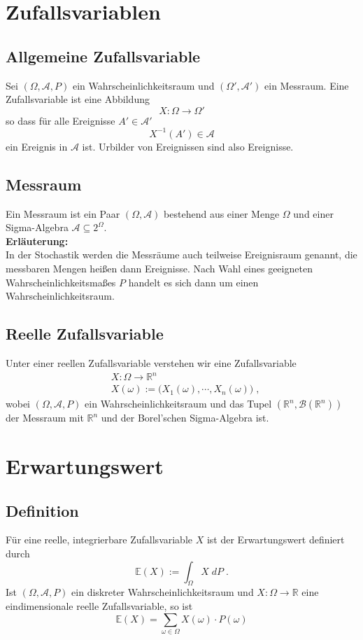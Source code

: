 \documentclass[a4paper]{article}
\begin{document}
\section{Zufallsvariablen}

\subsection{Allgemeine Zufallsvariable}
Sei $(\Omega, \mathcal{A}, P)$ ein Wahrscheinlichkeitsraum und $(\Omega', \mathcal{A}')$ ein Messraum. Eine Zufallsvariable ist eine Abbildung
$$X : \Omega \to \Omega'$$ 
so dass für alle Ereignisse $A' \in  \mathcal{A}'$
$$ X^{-1} (A') \in \mathcal{A}$$
 ein Ereignis in $\mathcal{A}$ ist. Urbilder von Ereignissen sind also Ereignisse.

\subsection{Messraum}
Ein Messraum ist ein Paar $(\Omega, \mathcal{A})$ bestehend aus einer Menge $\Omega$ und einer Sigma-Algebra $\mathcal{A} \subseteq 2^{\Omega}$.\\

\textbf{Erläuterung:}\\
In der Stochastik werden die Messräume auch teilweise Ereignisraum genannt, die messbaren Mengen heißen dann Ereignisse. Nach Wahl eines geeigneten Wahrscheinlichkeitsmaßes $P$ handelt es sich dann um einen Wahrscheinlichkeitsraum.

\subsection{Reelle Zufallsvariable}
Unter einer reellen Zufallsvariable verstehen wir eine Zufallsvariable 
\begin{align*}
& X : \Omega \to \mathbb{R}^n \\
& X(\omega) := \biggl(X_1(\omega), \cdots , X_n(\omega)  \biggr) \; ,
\end{align*}
wobei $(\Omega, \mathcal{A}, P)$ ein Wahrscheinlichkeitsraum und das Tupel $(\mathbb{R}^n, \mathcal{B}(\mathbb{R}^n))$ der Messraum mit $\mathbb{R}^n$ und der Borel'schen Sigma-Algebra ist.

\pagebreak
\section{Erwartungswert}

\subsection{Definition}
Für eine reelle, integrierbare Zufallsvariable $X$ ist der Erwartungswert definiert durch
$$ \mathbb{E} (X) := \int_{\Omega} X \; dP \; .$$
Ist $(\Omega, \mathcal{A}, P)$ ein diskreter Wahrscheinlichkeitsraum und $X :\Omega \to \mathbb{R}$ eine eindimensionale reelle Zufallsvariable, so ist
$$ \mathbb{E} (X) = \sum_{\omega \in \Omega}  X(\omega) \cdot P(\omega)$$
\end{document}
